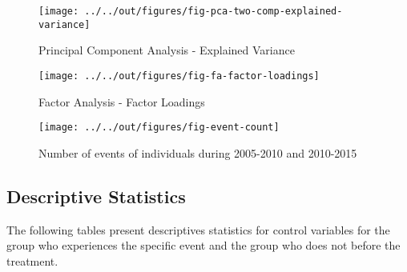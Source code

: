 \documentclass[12pt, a4paper, fleqn, parskip]{scrartcl}
\begin{document}
\begin{figure}[H]
    \centering
    \texttt{[image: ../../out/figures/fig-pca-two-comp-explained-variance]}
    \caption{Principal Component Analysis - Explained Variance}
    \label{fig:pca_ev}
\end{figure}

\begin{figure}[H]
    \centering
    \texttt{[image: ../../out/figures/fig-fa-factor-loadings]}
    \caption{Factor Analysis - Factor Loadings}
    \label{fig:fa_loadings}
\end{figure}

\begin{figure}[H]
    \centering
    \texttt{[image: ../../out/figures/fig-event-count]}
    \caption{Number of events of individuals during 2005-2010 and 2010-2015}
    \label{fig:events_count}
\end{figure}



\subsection{Descriptive Statistics} %
\label{sub:descriptive_statistics}

The following tables present descriptives statistics for control variables for the group
who experiences the specific event and the group who does not before the treatment.
















\end{document}
